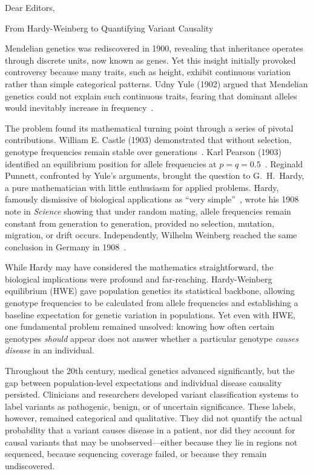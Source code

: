 \documentclass[12pt,a4paper]{letter}
\begin{document}
 
\begin{letter}{Dear Editors,}

\opening{}

From Hardy-Weinberg to Quantifying Variant Causality

Mendelian genetics was rediscovered in 1900, revealing that inheritance operates through discrete units, now known as genes. Yet this insight initially provoked controversy because many traits, such as height, exhibit continuous variation rather than simple categorical patterns. Udny Yule (1902) argued that Mendelian genetics could not explain such continuous traits, fearing that dominant alleles would inevitably increase in frequency~\cite{10}.

The problem found its mathematical turning point through a series of pivotal contributions. William E. Castle (1903) demonstrated that without selection, genotype frequencies remain stable over generations~\cite{11}. Karl Pearson (1903) identified an equilibrium position for allele frequencies at $p = q = 0.5$~\cite{12}. Reginald Punnett, confronted by Yule’s arguments, brought the question to G.~H.~Hardy, a pure mathematician with little enthusiasm for applied problems. Hardy, famously dismissive of biological applications as ``very simple''~\cite{13}, wrote his 1908 note in \textit{Science} showing that under random mating, allele frequencies remain constant from generation to generation, provided no selection, mutation, migration, or drift occurs. Independently, Wilhelm Weinberg reached the same conclusion in Germany in 1908~\cite{14,15}.

While Hardy may have considered the mathematics straightforward, the biological implications were profound and far-reaching. Hardy-Weinberg equilibrium (HWE) gave population genetics its statistical backbone, allowing genotype frequencies to be calculated from allele frequencies and establishing a baseline expectation for genetic variation in populations. Yet even with HWE, one fundamental problem remained unsolved: knowing how often certain genotypes \emph{should} appear does not answer whether a particular genotype \emph{causes disease} in an individual.

Throughout the 20th century, medical genetics advanced significantly, but the gap between population-level expectations and individual disease causality persisted. Clinicians and researchers developed variant classification systems to label variants as pathogenic, benign, or of uncertain significance. These labels, however, remained categorical and qualitative. They did not quantify the actual probability that a variant causes disease in a patient, nor did they account for causal variants that may be unobserved---either because they lie in regions not sequenced, because sequencing coverage failed, or because they remain undiscovered.


\end{letter}
\end{document}
